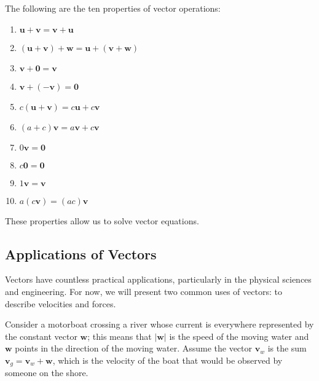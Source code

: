 \documentclass[../calc3.tex]{subfiles}
\begin{document}
The following are the ten properties of vector operations:
\begin{enumerate}
    \item $\textbf{u}+\textbf{v}=\textbf{v}+\textbf{u}$
    \item $(\textbf{u}+\textbf{v})+\textbf{w}=\textbf{u}+(\textbf{v}+\textbf{w})$
    \item $\textbf{v}+\textbf{0}=\textbf{v}$
    \item $\textbf{v}+(-\textbf{v})=\textbf{0}$
    \item $c(\textbf{u}+\textbf{v})=c\textbf{u}+c\textbf{v}$
    \item $(a+c)\textbf{v}=a\textbf{v}+c\textbf{v}$
    \item $0\textbf{v}=\textbf{0}$
    \item $c\textbf{0}=\textbf{0}$
    \item $1\textbf{v}=\textbf{v}$
    \item $a(c\textbf{v})=(ac)\textbf{v}$
\end{enumerate}

These properties allow us to solve vector equations.

\subsection*{Applications of Vectors}
Vectors have countless practical applications, particularly in the physical sciences and engineering. For now, we will present two common uses of vectors: to describe velocities and forces.

Consider a motorboat crossing a river whose current is everywhere represented by the constant vector $\textbf{w}$; this means that $|\textbf{w}|$ is the speed of the moving water and 
$\textbf{w}$ points in the direction of the moving water. Assume the vector $\textbf{v}_w$ is the sum $\textbf{v}_g=\textbf{v}_w+\textbf{w}$, which is the velocity of the boat that would be observed by someone on the shore.
\end{document}
